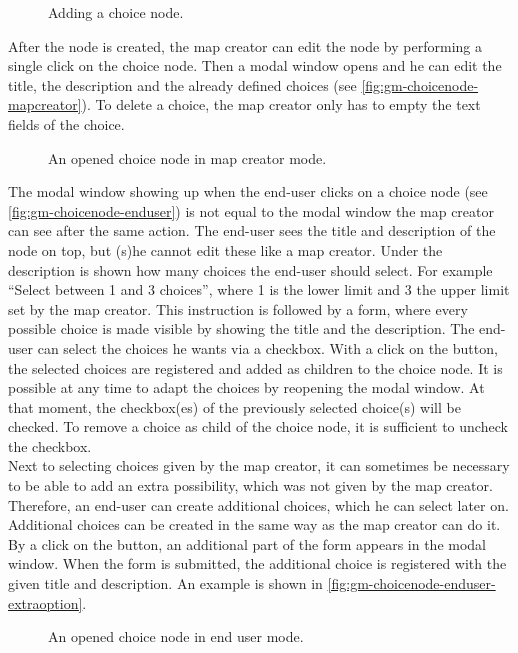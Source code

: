 \begin{figure}[H]
	\centering
	\caption{Adding a choice node.}
	\label{fig:gm-add-choice}
\end{figure}

After the node is created, the map creator can edit the node by performing a single click on the choice node. Then a modal window opens and he can edit the title, the description and the already defined choices (see \autoref{fig:gm-choicenode-mapcreator}). To delete a choice, the map creator only has to empty the text fields of the choice.

\begin{figure}[H]
	\centering
	\caption{An opened choice node in map creator mode.}
	\label{fig:gm-choicenode-mapcreator}
\end{figure}

The modal window showing up when the end-user clicks on a choice node (see \autoref{fig:gm-choicenode-enduser}) is not equal to the modal window the map creator can see after the same action. The end-user sees the title and description of the node on top, but (s)he cannot edit these like a map creator. Under the description is shown how many choices the end-user should select. For example ``Select between 1 and 3 choices'', where 1 is the lower limit and 3 the upper limit set by the map creator. This instruction is followed by a form, where every possible choice is made visible by showing the title and the description. The end-user can select the choices he wants via a checkbox. With a click on the button, the selected choices are registered and added as children to the choice node. It is possible at any time to adapt the choices by reopening the modal window. At that moment, the checkbox(es) of the previously selected choice(s) will be checked. To remove a choice as child of the choice node, it is sufficient to uncheck the checkbox.\\

Next to selecting choices given by the map creator, it can sometimes be necessary to be able to add an extra possibility, which was not given by the map creator. Therefore, an end-user can create additional choices, which he can select later on. Additional choices can be created in the same way as the map creator can do it. By a click on the button, an additional part of the form appears in the modal window. When the form is submitted, the additional choice is registered with the given title and description. An example is shown in \autoref{fig:gm-choicenode-enduser-extraoption}.
\begin{figure}[H]
	\centering
	\caption{An opened choice node in end user mode.}
	\label{fig:gm-choicenode-enduser}
\end{figure}

